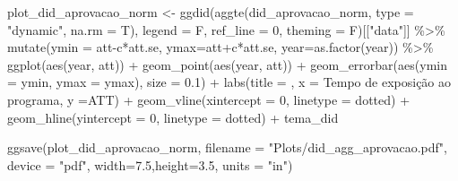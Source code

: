\documentclass[
  letterpaper,
  DIV=11,
  numbers=noendperiod]{scrartcl}
\newenvironment{Shaded}{\begin{snugshade}}{\end{snugshade}}
\newcommand{\AttributeTok}[1]{\textcolor[rgb]{0.40,0.45,0.13}{#1}}
\newcommand{\DecValTok}[1]{\textcolor[rgb]{0.68,0.00,0.00}{#1}}
\newcommand{\FloatTok}[1]{\textcolor[rgb]{0.68,0.00,0.00}{#1}}
\newcommand{\FunctionTok}[1]{\textcolor[rgb]{0.28,0.35,0.67}{#1}}
\newcommand{\NormalTok}[1]{\textcolor[rgb]{0.00,0.23,0.31}{#1}}
\newcommand{\OtherTok}[1]{\textcolor[rgb]{0.00,0.23,0.31}{#1}}
\newcommand{\SpecialCharTok}[1]{\textcolor[rgb]{0.37,0.37,0.37}{#1}}
\newcommand{\StringTok}[1]{\textcolor[rgb]{0.13,0.47,0.30}{#1}}
\begin{document}
\begin{Shaded}
\begin{Highlighting}[]
\NormalTok{plot\_did\_aprovacao\_norm }\OtherTok{\textless{}{-}}
\FunctionTok{ggdid}\NormalTok{(}\FunctionTok{aggte}\NormalTok{(did\_aprovacao\_norm, }\AttributeTok{type =} \StringTok{"dynamic"}\NormalTok{, }\AttributeTok{na.rm =}\NormalTok{ T),       }
      \AttributeTok{legend =}\NormalTok{ F, }\AttributeTok{ref\_line =} \DecValTok{0}\NormalTok{, }\AttributeTok{theming =}\NormalTok{ F)[[}\StringTok{"data"}\NormalTok{]] }\SpecialCharTok{\%\textgreater{}\%} 
    \FunctionTok{mutate}\NormalTok{(}\AttributeTok{ymin =}\NormalTok{ att}\SpecialCharTok{{-}}\NormalTok{c}\SpecialCharTok{*}\NormalTok{att.se, }\AttributeTok{ymax=}\NormalTok{att}\SpecialCharTok{+}\NormalTok{c}\SpecialCharTok{*}\NormalTok{att.se, }\AttributeTok{year=}\FunctionTok{as.factor}\NormalTok{(year)) }\SpecialCharTok{\%\textgreater{}\%} 
    \FunctionTok{ggplot}\NormalTok{(}\FunctionTok{aes}\NormalTok{(year, att)) }\SpecialCharTok{+}
    \FunctionTok{geom\_point}\NormalTok{(}\FunctionTok{aes}\NormalTok{(year, att)) }\SpecialCharTok{+}
    \FunctionTok{geom\_errorbar}\NormalTok{(}\FunctionTok{aes}\NormalTok{(}\AttributeTok{ymin =}\NormalTok{ ymin, }\AttributeTok{ymax =}\NormalTok{ ymax), }\AttributeTok{size =} \FloatTok{0.1}\NormalTok{) }\SpecialCharTok{+}
    \FunctionTok{labs}\NormalTok{(}\AttributeTok{title =} \StringTok{\textquotesingle{}\textquotesingle{}}\NormalTok{,}
         \AttributeTok{x =} \StringTok{\textquotesingle{}Tempo de exposição ao programa\textquotesingle{}}\NormalTok{,}
         \AttributeTok{y =}\StringTok{\textquotesingle{}ATT\textquotesingle{}}\NormalTok{) }\SpecialCharTok{+}
    \FunctionTok{geom\_vline}\NormalTok{(}\AttributeTok{xintercept =} \StringTok{\textquotesingle{}0\textquotesingle{}}\NormalTok{, }\AttributeTok{linetype =} \StringTok{\textquotesingle{}dotted\textquotesingle{}}\NormalTok{) }\SpecialCharTok{+}
    \FunctionTok{geom\_hline}\NormalTok{(}\AttributeTok{yintercept =} \DecValTok{0}\NormalTok{, }\AttributeTok{linetype =} \StringTok{\textquotesingle{}dotted\textquotesingle{}}\NormalTok{) }\SpecialCharTok{+}
\NormalTok{    tema\_did}

\FunctionTok{ggsave}\NormalTok{(plot\_did\_aprovacao\_norm, }
       \AttributeTok{filename =} \StringTok{"Plots/did\_agg\_aprovacao.pdf"}\NormalTok{,}
       \AttributeTok{device =} \StringTok{"pdf"}\NormalTok{,}
       \AttributeTok{width=}\FloatTok{7.5}\NormalTok{,}\AttributeTok{height=}\FloatTok{3.5}\NormalTok{, }\AttributeTok{units =} \StringTok{"in"}\NormalTok{)}


\end{Highlighting}
\end{Shaded}
\end{document}
